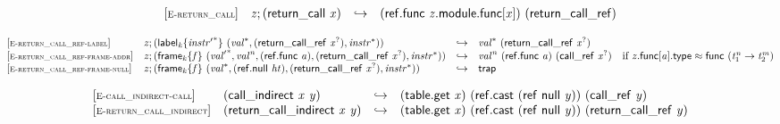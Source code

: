 \vspace{1ex}

$$
\begin{array}{@{}l@{}lcl@{}l@{}}
{[\textsc{\scriptsize E{-}return\_call}]} \quad & {\mathit{z}} ; (\mathsf{return\_call}~{\mathit{x}}) &\hookrightarrow& (\mathsf{ref.func}~{\mathit{z}}.\mathsf{module}.\mathsf{func}{}[{\mathit{x}}])~(\mathsf{return\_call\_ref}) &  \\
\end{array}
$$

\vspace{1ex}

$$
\begin{array}{@{}l@{}lcl@{}l@{}}
{[\textsc{\scriptsize E{-}return\_call\_ref{-}label}]} \quad & {\mathit{z}} ; ({{\mathsf{label}}_{{\mathit{k}}}}{\{{{\mathit{instr}'}^\ast}\}}~({{\mathit{val}}^\ast}, (\mathsf{return\_call\_ref}~{{\mathit{x}}^?}), {{\mathit{instr}}^\ast})) &\hookrightarrow& {{\mathit{val}}^\ast}~(\mathsf{return\_call\_ref}~{{\mathit{x}}^?}) &  \\
{[\textsc{\scriptsize E{-}return\_call\_ref{-}frame{-}addr}]} \quad & {\mathit{z}} ; ({{\mathsf{frame}}_{{\mathit{k}}}}{\{{\mathit{f}}\}}~({{\mathit{val}'}^\ast}, {{\mathit{val}}^{{\mathit{n}}}}, (\mathsf{ref.func}~{\mathit{a}}), (\mathsf{return\_call\_ref}~{{\mathit{x}}^?}), {{\mathit{instr}}^\ast})) &\hookrightarrow& {{\mathit{val}}^{{\mathit{n}}}}~(\mathsf{ref.func}~{\mathit{a}})~(\mathsf{call\_ref}~{{\mathit{x}}^?}) &\quad
  \mbox{if}~{\mathit{z}}.\mathsf{func}{}[{\mathit{a}}].\mathsf{type} \approx \mathsf{func}~({{\mathit{t}}_{{1}}^{{\mathit{n}}}} \rightarrow {{\mathit{t}}_{{2}}^{{\mathit{m}}}}) \\
{[\textsc{\scriptsize E{-}return\_call\_ref{-}frame{-}null}]} \quad & {\mathit{z}} ; ({{\mathsf{frame}}_{{\mathit{k}}}}{\{{\mathit{f}}\}}~({{\mathit{val}}^\ast}, (\mathsf{ref.null}~{\mathit{ht}}), (\mathsf{return\_call\_ref}~{{\mathit{x}}^?}), {{\mathit{instr}}^\ast})) &\hookrightarrow& \mathsf{trap} &  \\
\end{array}
$$

\vspace{1ex}

$$
\begin{array}{@{}l@{}lcl@{}l@{}}
{[\textsc{\scriptsize E{-}call\_indirect{-}call}]} \quad & (\mathsf{call\_indirect}~{\mathit{x}}~{\mathit{y}}) &\hookrightarrow& (\mathsf{table.get}~{\mathit{x}})~(\mathsf{ref.cast}~(\mathsf{ref}~\mathsf{null}~{\mathit{y}}))~(\mathsf{call\_ref}~{\mathit{y}}) &  \\
{[\textsc{\scriptsize E{-}return\_call\_indirect}]} \quad & (\mathsf{return\_call\_indirect}~{\mathit{x}}~{\mathit{y}}) &\hookrightarrow& (\mathsf{table.get}~{\mathit{x}})~(\mathsf{ref.cast}~(\mathsf{ref}~\mathsf{null}~{\mathit{y}}))~(\mathsf{return\_call\_ref}~{\mathit{y}}) &  \\
\end{array}
$$

